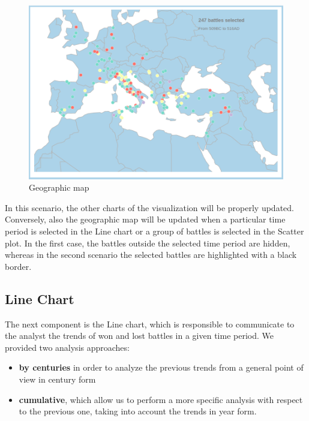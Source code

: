 \begin{figure}[h]
    \centering
    \includegraphics[scale=0.20]{./images/geographic_map.png}
    \caption{Geographic map}
\end{figure}

In this scenario, the other charts of the visualization will be properly updated. Conversely, also the geographic map will be updated when a particular time period is selected in the Line chart or a group of battles is selected in the Scatter plot. In the first case, the battles outside the selected time period are hidden, whereas in the second scenario the selected battles are highlighted with a black border.

\subsection{Line Chart}
The next component is the Line chart, which is responsible to communicate to the analyst the trends of won and lost battles in a given time period. We provided two analysis approaches:
\begin{itemize}
    \item \textbf{by centuries} in order to analyze the previous trends from a general point of view in century form
    \item \textbf{cumulative}, which allow us to perform a more specific analysis with respect to the previous one, taking into account the trends in year form.
\end{itemize}

